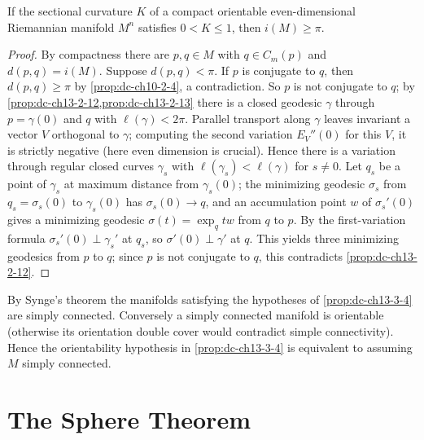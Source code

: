 \begin{proposition}
  \label{prop:dc-ch13-3-4}
  If the sectional curvature $K$ of a compact orientable even-dimensional Riemannian
  manifold $M^n$ satisfies $0<K\leq 1$, then $i(M)\geq\pi$.
\end{proposition}
\begin{proof}
\sketch
  By compactness there are $p,q\in M$ with $q\in C_m(p)$ and $d(p,q)=i(M)$.
  Suppose $d(p,q)<\pi$. If $p$ is conjugate to $q$, then $d(p,q)\geq\pi$ by
  \cref{prop:dc-ch10-2-4}, a contradiction. So $p$ is not conjugate to $q$; by
  \cref{prop:dc-ch13-2-12,prop:dc-ch13-2-13} there is a closed geodesic $\gamma$ through $p=\gamma(0)$
  and $q$ with $\ell(\gamma)<2\pi$. Parallel transport along $\gamma$ leaves invariant
  a vector $V$ orthogonal to $\gamma$; computing the second
  variation $E_V''(0)$ for this $V$, it is strictly negative (here even dimension is
  crucial). Hence there is a variation through regular closed curves $\gamma_s$ with
  $\ell(\gamma_s)<\ell(\gamma)$ for $s\neq0$. Let $q_s$ be a point of $\gamma_s$ at
  maximum distance from $\gamma_s(0)$; the minimizing geodesic $\sigma_s$ from
  $q_s=\sigma_s(0)$ to $\gamma_s(0)$ has $\sigma_s(0)\to q$, and an accumulation point
  $w$ of $\sigma_s'(0)$ gives a minimizing geodesic $\sigma(t)=\exp_q tw$ from $q$ to
  $p$. By the first-variation formula $\sigma_s'(0)\perp\gamma_s'$ at $q_s$, so
  $\sigma'(0)\perp\gamma'$ at $q$. This yields three minimizing geodesics from $p$ to
  $q$; since $p$ is not conjugate to $q$, this contradicts \cref{prop:dc-ch13-2-12}.
\end{proof}

\begin{remark}
  \label{rem:dc-ch13-3-5}
  By Synge's theorem the manifolds satisfying the hypotheses of
  \cref{prop:dc-ch13-3-4} are simply connected. Conversely a simply connected manifold is
  orientable (otherwise its orientation double cover would contradict simple
  connectivity). Hence the orientability hypothesis in
  \cref{prop:dc-ch13-3-4} is equivalent to assuming $M$ simply connected.
\end{remark}

\section{The Sphere Theorem}

